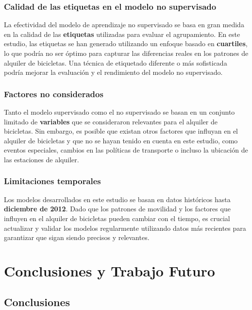 \documentclass{wsdcr}
\begin{document}
\subsubsection{Calidad de las etiquetas en el modelo no supervisado}

La efectividad del modelo de aprendizaje no supervisado se basa en gran medida en la calidad de las \textbf{etiquetas} utilizadas para evaluar el agrupamiento. En este estudio, las etiquetas se han generado utilizando un enfoque basado en \textbf{cuartiles}, lo que podría no ser óptimo para capturar las diferencias reales en los patrones de alquiler de bicicletas. Una técnica de etiquetado diferente o más sofisticada podría mejorar la evaluación y el rendimiento del modelo no supervisado.

\subsubsection{Factores no considerados}

Tanto el modelo supervisado como el no supervisado se basan en un conjunto limitado de \textbf{variables} que se consideraron relevantes para el alquiler de bicicletas. Sin embargo, es posible que existan otros factores que influyan en el alquiler de bicicletas y que no se hayan tenido en cuenta en este estudio, como eventos especiales, cambios en las políticas de transporte o incluso la ubicación de las estaciones de alquiler.

\subsubsection{Limitaciones temporales}

Los modelos desarrollados en este estudio se basan en datos históricos hasta \textbf{diciembre de 2012}. Dado que los patrones de movilidad y los factores que influyen en el alquiler de bicicletas pueden cambiar con el tiempo, es crucial actualizar y validar los modelos regularmente utilizando datos más recientes para garantizar que sigan siendo precisos y relevantes.

\section{Conclusiones y Trabajo Futuro}

\subsection{Conclusiones}
\end{document}
